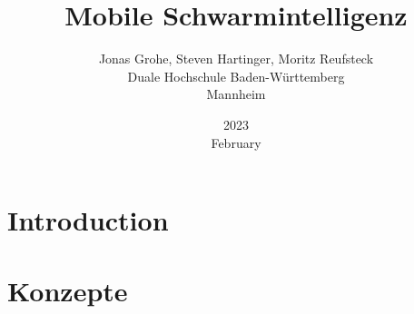 \documentclass[12pt, a4paper]{report}
\title{Mobile Schwarmintelligenz}
\date{2023\\ February}
\author{Jonas Grohe, Steven Hartinger, Moritz Reufsteck \\Duale Hochschule Baden-Württemberg \\ Mannheim}
\begin{document}
\maketitle
\chapter{Introduction}

\chapter{Konzepte}

\printbibliography
\end{document}
